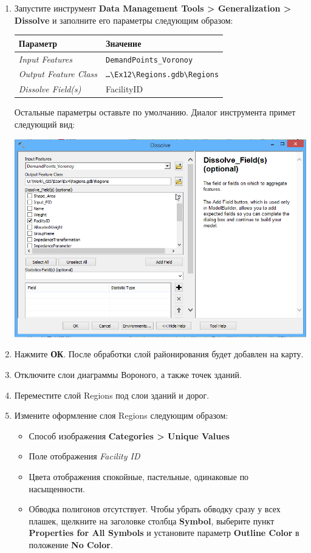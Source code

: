 \documentclass[12pt,]{book}
\begin{document}
\begin{enumerate}
\def\labelenumi{\arabic{enumi}.}
\item
  Запустите инструмент \textbf{Data Management Tools \textgreater{} Generalization \textgreater{} Dissolve} и заполните его параметры следующим образом:

  \begin{longtable}[]{@{}ll@{}}
  \toprule
  Параметр & Значение\tabularnewline
  \midrule
  \endhead
  \emph{Input Features} & \texttt{DemandPoints\_Voronoy}\tabularnewline
  \emph{Output Feature Class} & \texttt{\ldots{}\textbackslash{}Ex12\textbackslash{}Regions.gdb\textbackslash{}Regions}\tabularnewline
  \emph{Dissolve Field(s)} & FacilityID\tabularnewline
  \bottomrule
  \end{longtable}

  Остальные параметры оставьте по умолчанию. Диалог инструмента примет следующий вид:

  \includegraphics{images/Ex12/image31.png}
\item
  Нажмите \textbf{ОК}. После обработки слой районирования будет добавлен на карту.
\item
  Отключите слои диаграммы Вороного, а также точек зданий.
\item
  Переместите слой Regions под слои зданий и дорог.
\item
  Измените оформление слоя Regions следующим образом:

  \begin{itemize}
  \item
    Способ изображения \textbf{Categories \textgreater{} Unique Values}
  \item
    Поле отображения \emph{Facility ID}
  \item
    Цвета отображения спокойные, пастельные, одинаковые по насыщенности.
  \item
    Обводка полигонов отсутствует. Чтобы убрать обводку сразу у всех плашек, щелкните на заголовке столбца \textbf{Symbol}, выберите пункт \textbf{Properties for All Symbols} и установите параметр \textbf{Outline Color} в положение \textbf{No Color}.
  \end{itemize}


\end{enumerate}
\end{document}
